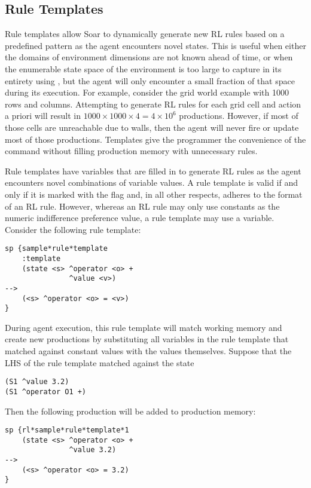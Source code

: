 \subsection{Rule Templates}
\label{RL-templates}

Rule templates allow Soar to dynamically generate new RL rules based on a predefined pattern as the agent encounters novel states.
This is useful when either the domains of environment dimensions are not known ahead of time, or when the enumerable state space of the environment is too large to capture in its entirety using , but the agent will only encounter a small fraction of that space during its execution.
For example, consider the grid world example with 1000 rows and columns.
Attempting to generate RL rules for each grid cell and action a priori will result in $1000 \times 1000 \times 4 = 4 \times 10^6$ productions.
However, if most of those cells are unreachable due to walls, then the agent will never fire or update most of those productions.
Templates give the programmer the convenience of the  command without filling production memory with unnecessary rules.

Rule templates have variables that are filled in to generate RL rules as the agent encounters novel combinations of variable values.
A rule template is valid if and only if it is marked with the  flag and, in all other respects, adheres to the format of an RL rule.
However, whereas an RL rule may only use constants as the numeric indifference preference value, a rule template may use a variable.
Consider the following rule template:

\begin{verbatim}
sp {sample*rule*template
    :template
    (state <s> ^operator <o> +
               ^value <v>)
-->
    (<s> ^operator <o> = <v>)
}
\end{verbatim}

During agent execution, this rule template will match working memory and create new productions by substituting all variables in the rule template that matched against constant values with the values themselves.
Suppose that the LHS of the rule template matched against the state

\begin{verbatim}
(S1 ^value 3.2)
(S1 ^operator O1 +)
\end{verbatim}

Then the following production will be added to production memory:

\begin{verbatim}
sp {rl*sample*rule*template*1
    (state <s> ^operator <o> +
               ^value 3.2)
-->
    (<s> ^operator <o> = 3.2)
}
\end{verbatim}

